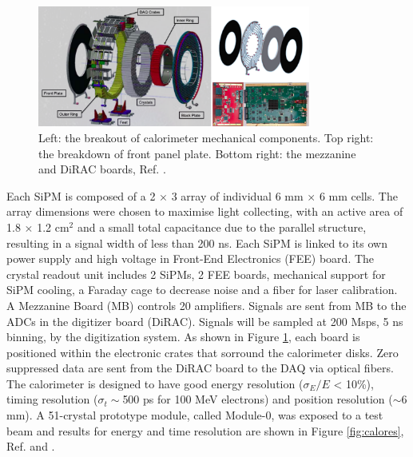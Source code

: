 \begin{figure}[!h]
        \centering
        \includegraphics[width =0.8\textwidth]{figures/png/Screenshot_20240322_121017.png}
        \caption{Left: the breakout of calorimeter mechanical components. Top right: the breakdown of front
        panel plate. Bottom right: the mezzanine and DiRAC boards, Ref. \cite{em4}.}
        \label{fig:calo3}
        \end{figure}

Each SiPM is composed of a 2 $\times$ 3 array of individual 6 mm $\times$ 6 mm cells. 
The array dimensions were chosen to maximise light collecting, with an active area of 1.8 $\times$ 1.2 cm$^2$ 
and a small total capacitance due to the parallel structure, resulting in a signal width of less than 200 ns.
Each SiPM is linked to its own power supply and high voltage in Front-End Electronics (FEE) board.
The crystal readout unit includes 2 SiPMs, 2 FEE boards, mechanical support for SiPM cooling, a Faraday cage to 
decrease noise and a fiber for laser calibration. A Mezzanine Board (MB) controls 20 amplifiers. Signals are sent from MB to the ADCs in the 
digitizer board (DiRAC). Signals will be sampled at 200 Msps, 5 ns binning, by the digitization system. 
As shown in Figure \ref{fig:calo3}, each board is positioned within the electronic crates that sorround the calorimeter disks.
Zero suppressed data are sent from the DiRAC board to the DAQ via optical fibers. 
The calorimeter is designed to have good energy resolution ($\sigma_E/E$ < 10\%), 
timing resolution ($\sigma_t \sim$500 ps for 100 MeV electrons) and position resolution
($\sim$6 mm). A 51-crystal prototype module, called Module-0, was exposed
to a test beam and results for energy and time resolution are
shown in Figure \ref{fig:calores}, Ref. \cite{bobbb} and \cite{calo95}.

